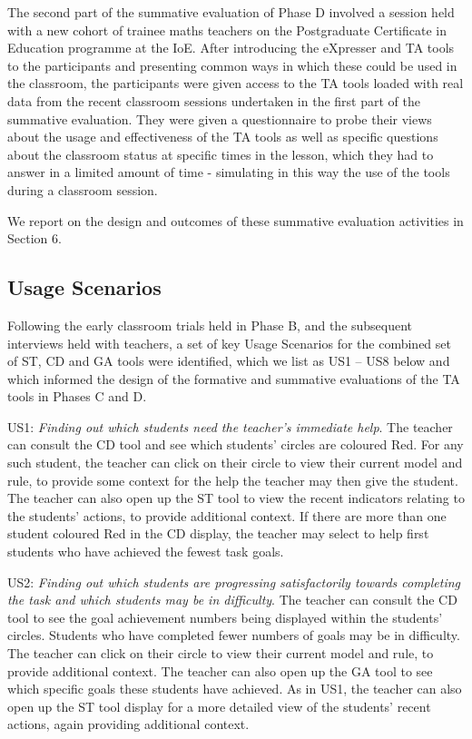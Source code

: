 The second part of the summative evaluation of Phase D involved a
session held with a new cohort of trainee maths teachers on the
Postgraduate Certificate in Education programme at the IoE. After
introducing the eXpresser and TA tools to the participants and
presenting common ways in which these could be used in the classroom,
the participants were given access to the TA tools loaded with real
data from the recent classroom sessions undertaken in the first part
of the summative evaluation. They were given a questionnaire to probe
their views about the usage and effectiveness of the TA tools as well
as specific questions about the classroom status at specific times in
the lesson, which they had to answer in a limited amount of time -
simulating in this way the use of the tools during a classroom
session.
 
We report on the design and outcomes of these summative evaluation
activities in Section 6.

\subsection*{Usage Scenarios}
\label{sec:usage-scenarios}

Following the early classroom trials held in Phase B, and the
subsequent interviews held with teachers, a set of key Usage Scenarios
for the combined set of ST, CD and GA tools were identified, which we
list as US1 – US8 below and which informed the design of the formative
and summative evaluations of the TA tools in Phases C and D.
 
US1: {\em Finding out which students need the teacher’s immediate
  help}. The teacher can consult the CD tool and see which students’
circles are coloured Red. For any such student, the teacher can click
on their circle to view their current model and rule, to provide some
context for the help the teacher may then give the student. The
teacher can also open up the ST tool to view the recent indicators
relating to the students’ actions, to provide additional context. If
there are more than one student coloured Red in the CD display, the
teacher may select to help first students who have achieved the fewest
task goals.
 
US2: {\em Finding out which students are progressing satisfactorily
  towards completing the task and which students may be in
  difficulty}. The teacher can consult the CD tool to see the goal
achievement numbers being displayed within the students’
circles. Students who have completed fewer numbers of goals may be in
difficulty. The teacher can click on their circle to view their
current model and rule, to provide additional context. The teacher can
also open up the GA tool to see which specific goals these students
have achieved. As in US1, the teacher can also open up the ST tool
display for a more detailed view of the students’ recent actions,
again providing additional context.

